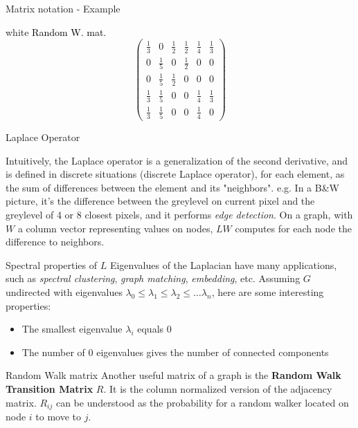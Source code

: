 \begin{textbox}{Matrix notation - Example}
\begin{multibox}{2}
\begin{subbox}{white}{\textcolor{black}{ Random W. mat.}}
\[\begin{pmatrix}
          \frac{1}{3} & 0           & \frac{1}{2} & \frac{1}{2} & \frac{1}{4} & \frac{1}{3} \\[6pt]
          0           & \frac{1}{5} & 0           & \frac{1}{2} & 0           & 0           \\[6pt]
          0           & \frac{1}{5} & \frac{1}{2} & 0           & 0           & 0           \\[6pt]
          \frac{1}{3} & \frac{1}{5} & 0           & 0           & \frac{1}{4} & \frac{1}{3} \\[6pt]
          \frac{1}{3} & \frac{1}{5} & 0           & 0           & \frac{1}{4} & 0
        \end{pmatrix}
      \]
    \end{subbox}
  \end{multibox}
\end{textbox}


\begin{textbox}{Laplace Operator}

  Intuitively, the Laplace operator is a generalization of the second derivative, and is defined in discrete situations (discrete Laplace operator), for each element, as the sum of differences between the element and its "neighbors". e.g. In a B\&W picture, it's the difference between the greylevel on current pixel and the greylevel of 4 or 8 closest pixels, and it performs \textit{edge detection}. On a graph, with $W$ a column vector representing values on nodes, $LW$ computes for each node the difference to neighbors.
\end{textbox}


\begin{textbox}{Spectral properties of $L$}
  Eigenvalues of the Laplacian have many applications, such as \textit{spectral clustering}, \textit{graph matching}, \textit{embedding}, etc. Assuming $G$ undirected with eigenvalues $\lambda_0 \leq \lambda_1 \leq \lambda_2 \leq \dots \lambda_n$, here are some interesting properties:
  \begin{itemize}
    \item The smallest eigenvalue $\lambda_i$ equals 0
    \item The number of 0 eigenvalues gives the number of connected components
  \end{itemize}
\end{textbox}


\begin{textbox}{Random Walk matrix}
  Another useful matrix of a graph is the \textbf{Random Walk Transition Matrix} $R$. It is the column normalized version of the adjacency matrix. $R_{ij}$ can be understood as the probability for a random walker located on node $i$ to move to $j$.

\end{textbox}

